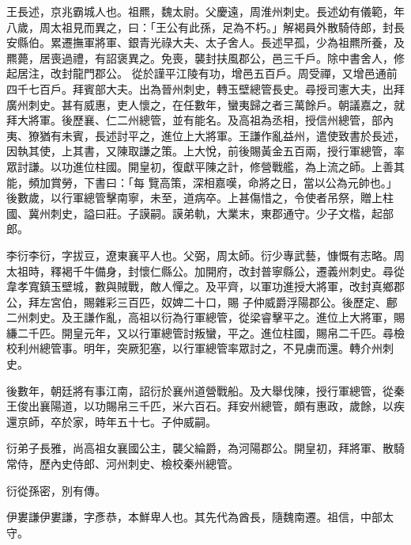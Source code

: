 
\begin{pinyinscope}

 王長述，京兆霸城人也。祖羆，魏太尉。父慶遠，周淮州刺史。長述幼有儀範，年八歲，周太祖見而異之，曰：「王公有此孫，足為不朽。」解褐員外散騎侍郎，封長安縣伯。累遷撫軍將軍、銀青光祿大夫、太子舍人。長述早孤，少為祖羆所養，及羆薨，居喪過禮，有詔褒異之。免喪，襲封扶風郡公，邑三千戶。除中書舍人，修起居注，改封龍門郡公。
 從於謹平江陵有功，增邑五百戶。周受禪，又增邑通前四千七百戶。拜賓部大夫。出為晉州刺史，轉玉壁總管長史。尋授司憲大夫，出拜廣州刺史。甚有威惠，吏人懷之，在任數年，蠻夷歸之者三萬餘戶。朝議嘉之，就拜大將軍。後歷襄、仁二州總管，並有能名。及高祖為丞相，授信州總管，部內夷、獠猶有未賓，長述討平之，進位上大將軍。王謙作亂益州，遣使致書於長述，因執其使，上其書，又陳取謙之策。上大悅，前後賜黃金五百兩，授行軍總管，率眾討謙。以功進位柱國。開皇初，復獻平陳之計，修營戰艦，為上流之師。上善其能，頻加賞勞，下書曰：「每
 覽高策，深相嘉嘆，命將之日，當以公為元帥也。」後數歲，以行軍總管擊南寧，未至，道病卒。上甚傷惜之，令使者吊祭，贈上柱國、冀州刺史，謚曰莊。子謨嗣。謨弟軌，大業末，東郡通守。少子文楷，起部郎。



 李衍李衍，字拔豆，遼東襄平人也。父弼，周太師。衍少專武藝，慷慨有志略。周太祖時，釋褐千牛備身，封懷仁縣公。加開府，改封普寧縣公，遷義州刺史。尋從韋孝寬鎮玉壁城，數與賊戰，敵人憚之。及平齊，以軍功進授大將軍，改封真鄉郡公，拜左宮伯，賜雜彩三百匹，奴婢二十口，賜
 子仲威爵浮陽郡公。後歷定、鄜二州刺史。及王謙作亂，高祖以衍為行軍總管，從梁睿擊平之。進位上大將軍，賜縑二千匹。開皇元年，又以行軍總管討叛蠻，平之。進位柱國，賜帛二千匹。尋檢校利州總管事。明年，突厥犯塞，以行軍總管率眾討之，不見虜而還。轉介州刺史。



 後數年，朝廷將有事江南，詔衍於襄州道營戰船。及大舉伐陳，授行軍總管，從秦王俊出襄陽道，以功賜帛三千匹，米六百石。拜安州總管，頗有惠政，歲餘，以疾還京師，卒於家，時年五十七。子仲威嗣。



 衍弟子長雅，尚高祖女襄國公主，襲父綸爵，為河陽郡公。開皇初，拜將軍、散騎
 常侍，歷內史侍郎、河州刺史、檢校秦州總管。



 衍從孫密，別有傳。



 伊婁謙伊婁謙，字彥恭，本鮮卑人也。其先代為酋長，隨魏南遷。祖信，中部太守。




\end{pinyinscope}
